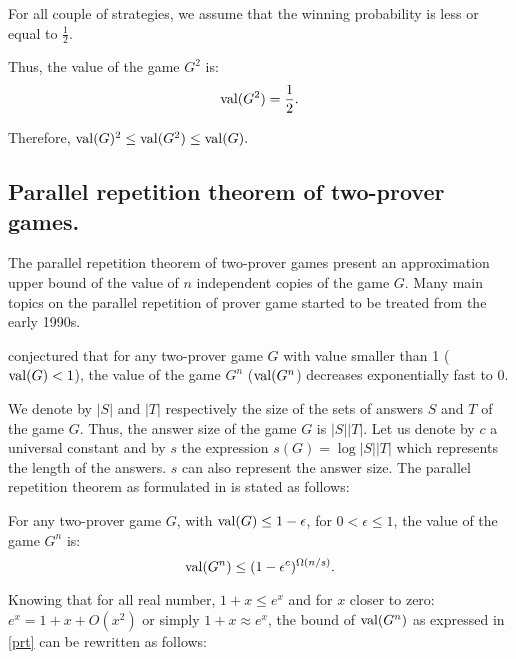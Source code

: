 For all couple of strategies, we assume that the winning probability is less or equal to $\frac{1}{2}.$

Thus, the value of the game $G^2$  is: $$\mathrm{val} (G^2)=\frac{1}{2}.$$

Therefore, $\mathrm{val} (G)^2\leq \mathrm{val} (G^2) \leq \mathrm{val} (G).$



\subsection{Parallel repetition theorem of two-prover games.}

The parallel repetition theorem of  two-prover games present an  approximation upper bound of the value of $n$ independent copies of the game $G$.
Many main topics on the parallel repetition of prover game started to be treated from the early 1990s. 

\cite{feige1992two} conjectured that  for any two-prover game $G$ with value smaller than 1 ($\mathrm{val} (G)<1$), the value of the game $G^n$ ($\mathrm{val} (G^n$) decreases exponentially fast to 0.

We denote by $|S|$ and $|T|$ respectively the size of the sets of answers $S$ and $T$ of the game $G$. Thus, the  answer  size of the game $G$ is $|S||T|$.
Let us denote by $c$ a universal constant and by $s$ the expression  $s(G)=\log |S||T|$ which represents the length of the answers. $s$ can also represent the  answer size.
The parallel repetition theorem as formulated in \cite{raz1998parallel,raz2010parallel} is stated as follows:

\begin{thm} For any two-prover game $G$, with $\mathrm{val} (G) \leq 1-\epsilon$, for $0 < \epsilon \leq 1$, the value of the game $G^n$ is: $$ \mathrm{val} (G^n) \leq (1-\epsilon^c)^{\Omega(n/s)}.$$ \label{prt}    \end{thm}

Knowing that for all real number, $1+x \leq e^x$ and
for $x$ closer to zero:  $e^x = 1+x+O(x^2)$ or simply  $1+x \approx e^x$,
the bound of $\mathrm{val} (G^n)$ as expressed in \eqref{prt} can be rewritten as follows:

